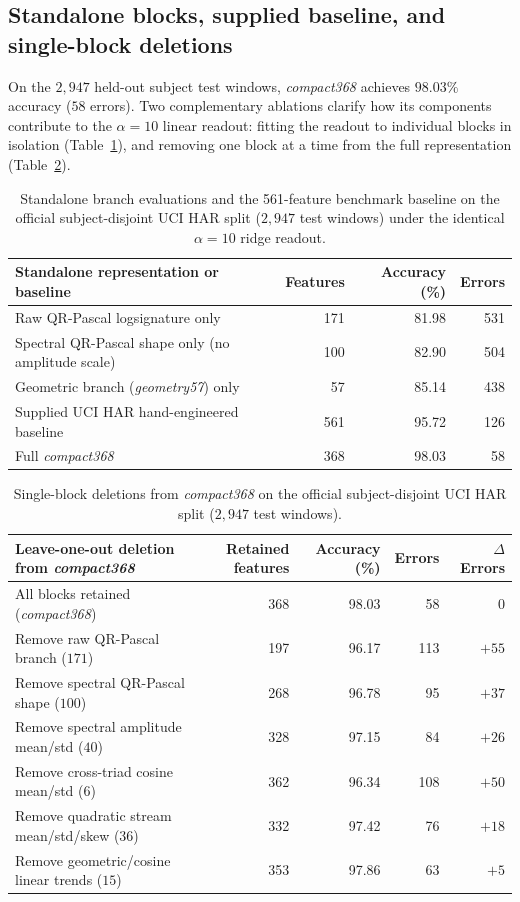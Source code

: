 \subsection{Standalone blocks, supplied baseline, and single-block deletions}
\label{app:ablations}
On the \(2{,}947\) held-out subject test windows, \emph{compact368} achieves
\(98.03\%\) accuracy (\(58\) errors). Two complementary ablations clarify how its
components contribute to the \(\alpha = 10\) linear readout: fitting the readout
to individual blocks in isolation (Table~\ref{tab:har-standalone}), and removing
one block at a time from the full representation (Table~\ref{tab:har-deletions}).

\begin{table}[ht]
\centering
\begin{tabular}{@{}lrrr@{}}
\toprule
Standalone representation or baseline & Features & Accuracy (\%) & Errors \\
\midrule
Raw QR-Pascal logsignature only & 171 & 81.98 & 531 \\
Spectral QR-Pascal shape only (no amplitude scale) & 100 & 82.90 & 504 \\
Geometric branch (\emph{geometry57}) only & 57 & 85.14 & 438 \\
Supplied UCI HAR hand-engineered baseline & 561 & 95.72 & 126 \\
Full \emph{compact368} & 368 & 98.03 & 58 \\
\bottomrule
\end{tabular}
\caption{Standalone branch evaluations and the 561-feature benchmark baseline on
the official subject-disjoint UCI HAR split (\(2{,}947\) test windows) under the
identical \(\alpha = 10\) ridge readout.}
\label{tab:har-standalone}
\end{table}

\begin{table}[ht]
\centering
\begin{tabular}{@{}lrrrr@{}}
\toprule
Leave-one-out deletion from \emph{compact368} & Retained features & Accuracy (\%) & Errors & \(\Delta\) Errors \\
\midrule
All blocks retained (\emph{compact368}) & 368 & 98.03 & 58 & \(0\) \\
Remove raw QR-Pascal branch (\(171\)) & 197 & 96.17 & 113 & \(+55\) \\
Remove spectral QR-Pascal shape (\(100\)) & 268 & 96.78 & 95 & \(+37\) \\
Remove spectral amplitude mean/std (\(40\)) & 328 & 97.15 & 84 & \(+26\) \\
Remove cross-triad cosine mean/std (\(6\)) & 362 & 96.34 & 108 & \(+50\) \\
Remove quadratic stream mean/std/skew (\(36\)) & 332 & 97.42 & 76 & \(+18\) \\
Remove geometric/cosine linear trends (\(15\)) & 353 & 97.86 & 63 & \(+5\) \\
\bottomrule
\end{tabular}
\caption{Single-block deletions from \emph{compact368} on the official
subject-disjoint UCI HAR split (\(2{,}947\) test windows).}
\label{tab:har-deletions}
\end{table}

